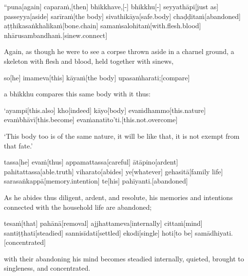 \vskip 0.2in
\begin{samepage}
\begingl[glneveryline={\PaliGlossA,\PaliGlossB}]
“puna[again] caparaṁ,[then] bhikkhave,[-] bhikkhu[-] seyyathāpi[just as] passeyya[aside] sarīraṁ[the body] sivathikāya[safe.body] chaḍḍitaṁ[abandoned] aṭṭhikasaṅkhalikaṁ[bone.chain] samaṁsalohitaṁ[with.flesh.blood] nhārusambandhaṁ.[sinew.connect]
\endgl
\nopagebreak
\linespread{0.5}
\begin{spacin}{0.2}
{\PaliGlossFT Again, as though he were to see a corpse thrown aside in a charnel ground, a skeleton with flesh and blood, held together with sinews,}
\end{spacin}
\vskip 12pt
\end{samepage}
\begin{samepage}
\begingl[glneveryline={\PaliGlossA,\PaliGlossB}]
so[he] imameva[this] kāyaṁ[the body] upasaṁharati;[compare]
\endgl
\nopagebreak
\linespread{0.5}
\begin{spacin}{0.2}
{\PaliGlossFT a bhikkhu compares this same body with it thus:}
\end{spacin}
\vskip 12pt
\end{samepage}
\begin{samepage}
\begingl[glneveryline={\PaliGlossA,\PaliGlossB}]
‘ayampi[this.also] kho[indeed] kāyo[body] evaṁdhammo[this.nature] evaṁbhāvī[this.become] evaṁanatīto’ti.[this.not.overcome]
\endgl
\nopagebreak
\linespread{0.5}
\begin{spacin}{0.2}
{\PaliGlossFT ‘This body too is of the same nature, it will be like that, it is not exempt from that fate.’}
\end{spacin}
\vskip 12pt
\end{samepage}
\begin{samepage}
\begingl[glneveryline={\PaliGlossA,\PaliGlossB}]
tassa[he] evaṁ[thus] appamattassa[careful] ātāpino[ardent] pahitattassa[able.truth] viharato[abides] ye[whatever] gehasitā[family life] sarasaṅkappā[memory.intention] te[his] pahīyanti.[abandoned]
\endgl
\nopagebreak
\linespread{0.5}
\begin{spacin}{0.2}
{\PaliGlossFT As he abides thus diligent, ardent, and resolute, his memories and intentions connected with the household life are abandoned;}
\end{spacin}
\vskip 12pt
\end{samepage}
\begin{samepage}
\begingl[glneveryline={\PaliGlossA,\PaliGlossB}]
tesaṁ[that] pahānā[removal] ajjhattameva[internally] cittaṁ[mind] santiṭṭhati[steadied] sannisīdati[settled] ekodi[single] hoti[to be] samādhiyati.[concentrated]
\endgl
\nopagebreak
\linespread{0.5}
\begin{spacin}{0.2}
{\PaliGlossFT with their abandoning his mind becomes steadied internally, quieted, brought to singleness, and concentrated.}
\end{spacin}
\vskip 12pt
\end{samepage}
